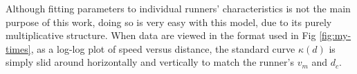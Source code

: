 \documentclass[10pt,letterpaper]{article}
\begin{document}
Although fitting parameters to individual runners' characteristics is not the main purpose of this work, doing
so is very easy with this model, due to its purely multiplicative structure.
When data are viewed in the format used in Fig \ref{fig:my-times}, as a log-log plot of speed versus distance,
the standard curve $\kappa(d)$ is simply slid around horizontally and vertically to match the runner's $v_m$ and $d_c$.



\end{document}

